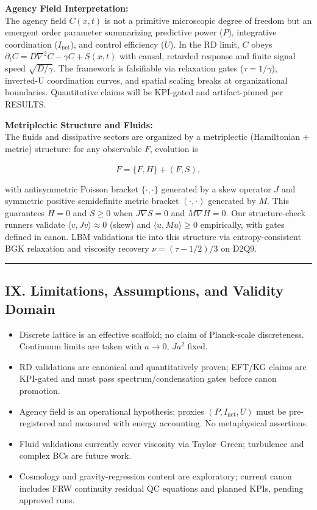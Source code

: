 \documentclass[
]{article}
\providecommand{\tightlist}{%
  \setlength{\itemsep}{0pt}\setlength{\parskip}{0pt}}
\begin{document}
\textbf{Agency Field Interpretation:}\\
The agency field \(C(x,t)\) is not a primitive microscopic degree of
freedom but an emergent order parameter summarizing predictive power
(\(P\)), integrative coordination (\(I_{\mathrm{net}}\)), and control
efficiency (\(U\)). In the RD limit, \(C\) obeys
\(\partial_{t} C = D\nabla^{2}C - \gamma C + S(x,t)\) with causal,
retarded response and finite signal speed \(\sqrt{D/\gamma}\). The
framework is falsifiable via relaxation gates (\(\tau=1/\gamma\)),
inverted-U coordination curves, and spatial scaling breaks at
organizational boundaries. Quantitative claims will be KPI-gated and
artifact-pinned per RESULTS.

\textbf{Metriplectic Structure and Fluids:}\\
The fluids and dissipative sectors are organized by a metriplectic
(Hamiltonian + metric) structure: for any observable \(F\), evolution is

\[
\dot F = \{F,H\} + (F,S),
\]

with antisymmetric Poisson bracket \(\{\cdot,\cdot\}\) generated by a
skew operator \(J\) and symmetric positive semidefinite metric bracket
\((\cdot,\cdot)\) generated by \(M\). This guarantees \(\dot H = 0\) and
\(\dot S \ge 0\) when \(J\nabla S=0\) and \(M\nabla H=0\). Our
structure-check runners validate \(\langle v, Jv\rangle \approx 0\)
(skew) and \(\langle u,Mu\rangle \ge 0\) empirically, with gates defined
in canon. LBM validations tie into this structure via entropy-consistent
BGK relaxation and viscosity recovery \(\nu = (\tau-1/2)/3\) on D2Q9.

\begin{center}\rule{0.5\linewidth}{0.5pt}\end{center}

\hypertarget{ix.-limitations-assumptions-and-validity-domain}{%
\subsection{IX. Limitations, Assumptions, and Validity
Domain}\label{ix.-limitations-assumptions-and-validity-domain}}

\begin{itemize}
\tightlist
\item
  Discrete lattice is an effective scaffold; no claim of Planck-scale
  discreteness. Continuum limits are taken with \(a\to 0\), \(Ja^{2}\)
  fixed.
\item
  RD validations are canonical and quantitatively proven; EFT/KG claims
  are KPI-gated and must pass spectrum/condensation gates before canon
  promotion.
\item
  Agency field is an operational hypothesis; proxies
  \((P,I_{\mathrm{net}},U)\) must be pre-registered and measured with
  energy accounting. No metaphysical assertions.
\item
  Fluid validations currently cover viscosity via Taylor--Green;
  turbulence and complex BCs are future work.
\item
  Cosmology and gravity-regression content are exploratory; current
  canon includes FRW continuity residual QC equations and planned KPIs,
  pending approved runs.
\end{itemize}
\end{document}
